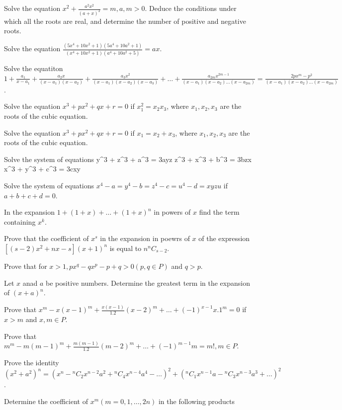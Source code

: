 \item Solve the equation $x^2 + \frac{a^2x^2}{(a + x)^2} = m, a, m > 0$. Deduce the conditions under which all the roots are real,
  and determine the number of positive and negative roots.
\item Solve the equation $\frac{(5x^4 + 10x^2 + 1)(5a^4 + 10a^2 + 1)}{(x^4 + 10x^2 +1)(a^4 + 10a^2 + 5)} = ax$.
\item Solve the equatiton $1 + \frac{a_1}{x - a_1} + \frac{a_2x}{(x - a_1)(x - a_2)} + \frac{a_3x^2}{(x - a_1)(x - a_2)(x - a_3)} +
  \ldots + \frac{a_{2m}x^{2m - 1}}{(x - a_1)(x - a_2)\ldots(x - a_{2m})} = \frac{2px^m - p^2}{(x - a_1)(x - a_2) \ldots (x - a_{2m})}$.
\item Solve the equation $x^3 + px^2 + qx + r = 0$ if $x_1^2 = x_2x_3$, where $x_1, x_2, x_3$ are the roots of the cubic equation.
\item Solve the equation $x^3 + px^2 + qx + r = 0$ if $x_1 = x_2 + x_3$, where $x_1, x_2, x_3$ are the roots of the cubic equation.
\item Solve the system of equations
  \startformula y^3 + z^3 + a^3 = 3ayz\stopformula
  \startformula z^3 + x^3 + b^3 = 3bzx\stopformula
  \startformula x^3 + y^3 + c^3 = 3cxy\stopformula
\item Solve the system of equations $x^4 - a = y^4 - b = z^4 - c = u^4 - d = xyzu$ if $a + b + c + d = 0$.
\item In the expansion $1 + (1 + x) + \ldots + (1 + x)^n$ in powers of $x$ find the term containing $x^k$.
\item Prove that the coefficient of $x^s$ in the expansion in poewrs of $x$ of the expression $[(s - 2)x^2 + nx - s](x + 1)^n$ is
  equal to $n{}^nC_{s - 2}$.
\item Prove that for $x>1, px^q - qx^p - p + q > 0 (p, q\in P)$ and $q > p$.
\item Let $x$ anad $a$ be positive numbers. Determine the greatest term in the expansion of $(x + a)^n$.
\item Prove that $x^m - x(x - 1)^m + \frac{x(x - 1)}{1.2}(x - 2)^m + \ldots + (-1)^{x - 1}x.1^m = 0$ if $x > m$ and $x,m\in P$.
\item Prove that $m^m - m(m - 1)^m + \frac{m(m - 1)}{1.2}(m - 2)^m + \ldots + (-1)^{m - 1}m = m!, m \in P$.
\item Prove the identity $(x^2 + a^2)^n = (x^n - {}^nC_2x^{n - 2}a^2 + {}^nC_4x^{n - 4}a^4 - \ldots)^2 + ({}^nC_1x^{n - 1}a - {}^nC_3x^{n -
  3}a^3 +\ldots)^2$.
\item Determine the coefficient of $x^m(m = 0, 1, \ldots, 2n)$ in the following products

